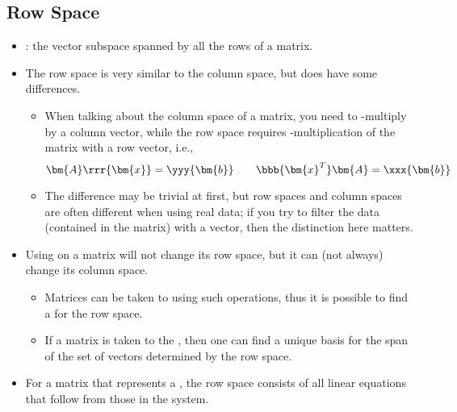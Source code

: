 \begin{itemize}
  \subsection{Row Space}\label{Row Space}
  \begin{itemize}
    \item {}: the vector subspace spanned by all the rows of a matrix. 
    \item The row space is very similar to the column space, but does have some differences.
      \begin{itemize}
        \item When talking about the column space of a matrix, you need to -multiply by a column vector, while the row space requires -multiplication of the matrix with a row vector, i.e.,
        \[%
        \bm{A}\rrr{\bm{x}}=\yyy{\bm{b}} \qquad \bbb{\bm{x}^T}\bm{A}=\xxx{\bm{b}}
        \]%
        \item The difference may be trivial at first, but row spaces and column spaces are often different when using real data; if you try to filter the data (contained in the matrix) with a vector, then the distinction here matters.
      \end{itemize}
    \item Using \hyperref[Elementary Operations]{} on a matrix will not change its row space, but it can (not always) change its column space.
      \begin{itemize}
        \item Matrices can be taken to \hyperref[Row Echelon form]{} using such operations, thus it is possible to find a \hyperref[Basis]{} for the row space.
        \item If a matrix is taken to the \hyperref[Gaussian Elimination]{}, then one can find a unique basis for the span of the set of vectors determined by the row space.
      \end{itemize}
    \item For a matrix that represents a \hyperref[Homogeneous Solution Sets]{}, the row space consists of all linear equations that follow from those in the system. 
  \end{itemize}  
\end{itemize}

